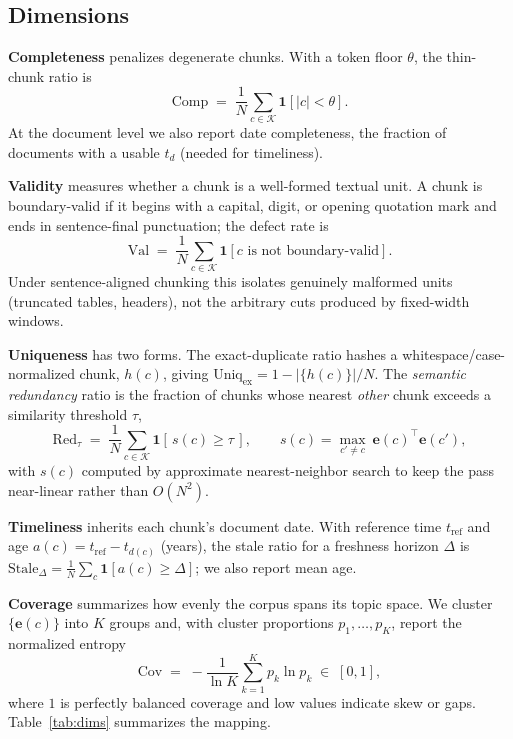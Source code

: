 \documentclass[conference]{IEEEtran}
\begin{document}
\subsection{Dimensions}
\textbf{Completeness} penalizes degenerate chunks. With a token floor $\theta$, the
thin-chunk ratio is
\begin{equation}
\mathrm{Comp} \;=\; \frac{1}{N}\sum_{c\in\mathcal{K}} \mathbf{1}\!\left[\lvert c\rvert < \theta\right].
\end{equation}
At the document level we also report date completeness, the fraction of documents with a
usable $t_d$ (needed for timeliness).

\noindent\textbf{Validity} measures whether a chunk is a well-formed textual unit. A chunk is
boundary-valid if it begins with a capital, digit, or opening quotation mark and ends in
sentence-final punctuation; the defect rate is
\begin{equation}
\mathrm{Val} \;=\; \frac{1}{N}\sum_{c\in\mathcal{K}} \mathbf{1}\!\left[c \text{ is not boundary-valid}\right].
\end{equation}
Under sentence-aligned chunking this isolates genuinely malformed units (truncated tables,
headers), not the arbitrary cuts produced by fixed-width windows.

\noindent\textbf{Uniqueness} has two forms. The exact-duplicate ratio hashes a
whitespace/case-normalized chunk, $h(c)$, giving
$\mathrm{Uniq}_{\mathrm{ex}} = 1 - \lvert\{h(c)\}\rvert / N$. The \emph{semantic redundancy}
ratio is the fraction of chunks whose nearest \emph{other} chunk exceeds a similarity
threshold $\tau$,
\begin{equation}
\mathrm{Red}_{\tau} \;=\; \frac{1}{N}\sum_{c\in\mathcal{K}}
\mathbf{1}\!\left[\, s(c) \ge \tau \,\right],\qquad
s(c)=\max_{c'\neq c}\ \mathbf{e}(c)^{\!\top}\mathbf{e}(c'),
\end{equation}
with $s(c)$ computed by approximate nearest-neighbor search to keep the pass near-linear
rather than $O(N^2)$.

\noindent\textbf{Timeliness} inherits each chunk's document date. With reference time
$t_{\mathrm{ref}}$ and age $a(c)=t_{\mathrm{ref}}-t_{d(c)}$ (years), the stale ratio for a
freshness horizon $\Delta$ is
$\mathrm{Stale}_{\Delta}=\frac{1}{N}\sum_{c}\mathbf{1}[a(c)\ge\Delta]$; we also report mean age.

\noindent\textbf{Coverage} summarizes how evenly the corpus spans its topic space. We cluster
$\{\mathbf{e}(c)\}$ into $K$ groups and, with cluster proportions $p_1,\dots,p_K$, report the
normalized entropy
\begin{equation}
\mathrm{Cov} \;=\; -\frac{1}{\ln K}\sum_{k=1}^{K} p_k \ln p_k \;\in\; [0,1],
\end{equation}
where $1$ is perfectly balanced coverage and low values indicate skew or gaps. Table~\ref{tab:dims}
summarizes the mapping.
\end{document}
